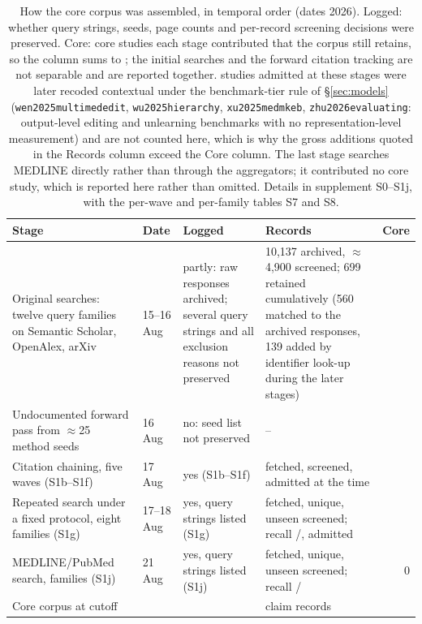 \begin{table}[!tbp]
\centering\scriptsize\setlength\tabcolsep{2pt}\renewcommand{\arraystretch}{1.0}
\caption{How the core corpus was assembled, in temporal order (dates 2026). Logged: whether query strings, seeds, page counts
and per-record screening decisions were preserved. Core: core studies each stage contributed that the corpus still retains, so
the column sums to \Ncore{}; the initial searches and the forward citation tracking are not separable and are reported together.
\Nrecoded{} studies admitted at these stages were later recoded contextual under the benchmark-tier rule of
\S\ref{sec:models} (\texttt{wen2025multimededit}, \texttt{wu2025hierarchy}, \texttt{xu2025medmkeb},
\texttt{zhu2026evaluating}: output-level editing and unlearning benchmarks with no representation-level measurement) and are
not counted here, which is why the gross additions quoted in the Records column exceed the Core column. The last stage searches MEDLINE directly rather than through the aggregators; it contributed no core study, which is reported here rather than omitted. Details in supplement
S0--S1j, with the per-wave and per-family tables S7 and S8.}
\label{tab:searchflow}
\begin{tabular}{@{}L{1.95cm}L{0.9cm}L{1.4cm}L{2.15cm}r@{}}
\toprule
Stage & Date & Logged & Records & Core \\
\midrule
Original searches: twelve query families on Semantic Scholar, OpenAlex, arXiv & 15--16 Aug & partly: raw responses archived; several query strings and all exclusion reasons not preserved & 10,137 archived, ${\approx}$4,900 screened; 699 retained cumulatively (560 matched to the archived responses, 139 added by identifier look-up during the later stages) &  \\
Undocumented forward pass from ${\approx}$25 method seeds & 16 Aug & no: seed list not preserved & -- & \\
Citation chaining, five waves (S1b--S1f) & 17 Aug & yes (S1b--S1f) & \chainFetchedAll{} fetched, \chainScreenedAll{} screened, \chainStudiesAdded{} admitted at the time & \Nstagechain{} \\
Repeated search under a fixed protocol, eight families (S1g) & 17--18 Aug & yes, query strings listed (S1g) & \frozenFetched{} fetched, \frozenUnique{} unique, \frozenScreened{} unseen screened; recall \frozenRecall{}/\frozenPreCore{}, \frozenCoreCoded{} admitted & \Nstagefrozen{} \\
MEDLINE/PubMed search, \pmFamilies{} families (S1j) & 21 Aug & yes, query strings listed (S1j) & \pmRaw{} fetched, \pmUnique{} unique, \pmCandidates{} unseen screened; recall \pmRecall{}/\pmCoreTotal{} & 0 \\
\midrule
Core corpus at cutoff & & & \Nclaims{} claim records & \Ncore{} \\
\bottomrule
\end{tabular}
\end{table}
